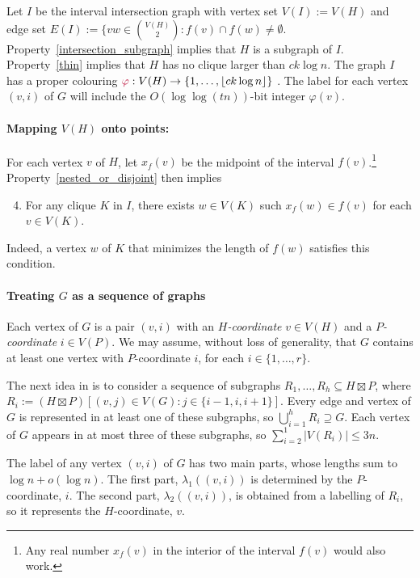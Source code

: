 \documentclass{patmorin}
\makeatletter
\renewcommand{\le}{\leqslant}
\newcommand{\defin}[1]{\emph{\textcolor{brightmaroon}{#1}}}
\def\mathcolor#1#{\@mathcolor{#1}}
\def\@mathcolor#1#2#3{%
  \protect\leavevmode
  \begingroup
    \color#1{#2}#3%
  \endgroup
}
\newcommand{\mathdefin}[1]{\mathcolor{brightmaroon}{#1}}
\makeatother
\begin{document}
  Let $I$ be the interval intersection graph with vertex set $V(I):=V(H)$ and edge set $E(I):=\{vw\in\binom{V(H)}{2}:f(v)\cap f(w)\neq\emptyset$.  Property~\ref{intersection_subgraph} implies that $H$ is a subgraph of $I$. Property~\ref{thin} implies that $H$ has no clique larger than $ck\log n$.  The graph $I$ has a proper colouring $\mathdefin{\varphi}:V(H)\to\{1,\ldots,\lfloor ck\log n\rfloor\}$ \cite{gilmore.hoffman:characterization}.  The label for each vertex $(v,i)$ of $G$ will include the $O(\log\log (tn))$-bit integer $\varphi(v)$.

  \paragraph{\boldmath Mapping $V(H)$ onto points:}
  For each vertex $v$ of $H$, let $x_f(v)$ be the midpoint of the interval $f(v)$.\footnote{Any real number $x_f(v)$ in the interior of the interval $f(v)$ would also work.}  Property~\ref{nested_or_disjoint} then implies
  \begin{enumerate}\setcounter{enumi}{3}
      \item\label{clique_property} For any clique $K$ in $I$, there exists $w\in V(K)$ such $x_f(w)\in f(v)$ for each $v\in V(K)$.
  \end{enumerate}
  Indeed, a vertex $w$ of $K$ that minimizes the length of $f(w)$ satisfies this condition.

  \paragraph{\boldmath Treating $G$ as a sequence of graphs}

  Each vertex of $G$ is a pair $(v,i)$ with an \defin{$H$-coordinate} $v\in V(H)$ and a \defin{$P$-coordinate} $i\in V(P)$.  We may assume, without loss of generality, that $G$ contains at least one vertex with $P$-coordinate $i$, for each $i\in\{1,\ldots,r\}$.

  The next idea in \cite{dujmovic.esperet.ea:adjacency} is to consider a sequence of subgraphs $R_1,\ldots,R_h\subseteq H\boxtimes P$, where $R_i:=(H\boxtimes P)[(v,j)\in V(G):j\in\{i-1,i,i+1\}]$. Every edge and vertex of $G$ is represented in at least one of these subgraphs, so $\bigcup_{i=1}^h R_i\supseteq G$. Each vertex of $G$ appears in at most three of these subgraphs, so $\sum_{i=2}^1 |V(R_i)|\le 3n$.

  The label of any vertex $(v,i)$ of $G$ has two main parts, whose lengths sum to $\log n+o(\log n)$. The first part, $\lambda_1((v,i))$ is determined by the $P$-coordinate, $i$.  The second part, $\lambda_2((v,i))$, is obtained from a labelling of $R_i$, so it represents the $H$-coordinate, $v$.
\end{document}
